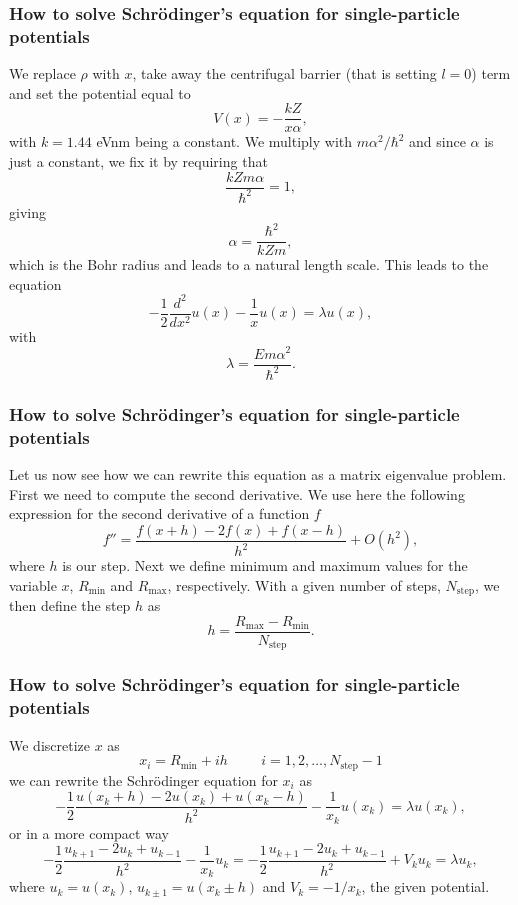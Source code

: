 \documentclass[compress]{beamer}
\begin{document}
\frame
{
  \frametitle{How to solve Schr\"odinger's equation for single-particle potentials}
\begin{small}
{\scriptsize
%
We replace $\rho$ with $x$, take away the 
centrifugal barrier (that is setting $l=0$) term and set the potential equal to
\[
   V(x)=-\frac{kZ}{x\alpha},
\]
with  $k=1.44$ eVnm being a constant. We multiply with $m \alpha^2/\hbar^2$ and since $\alpha$ is just a constant, we fix it by requiring that
\[
\frac{kZm \alpha}{\hbar^2}=1,
\]
giving 
\[
\alpha = \frac{\hbar^2}{kZm},
\]
which is the Bohr radius and leads to a natural length scale.
This leads to the equation
\[
  -\frac{1}{2} \frac{d^2}{dx^2} u(x) -\frac{1}{x}u(x)  = \lambda u(x),
\]
with 
\[
\lambda = \frac{E m \alpha^2}{\hbar^2}. 
\]
}
\end{small}
}


%



\frame
{
  \frametitle{How to solve Schr\"odinger's equation for single-particle potentials}
\begin{small}
{\scriptsize
Let us now see how we can rewrite this equation as a matrix eigenvalue problem.
First we need to compute  the second derivative. We use here the
following expression for the second derivative of a function $f$
\[
    f''=\frac{f(x+h) -2f(x) +f(x-h)}{h^2} +O(h^2),
\]
where $h$ is our step.
Next we define minimum and maximum values for the variable $x$,
$R_{\mathrm{min}}$  and $R_{\mathrm{max}}$, respectively.
With a given number of steps, $N_{\mathrm{step}}$, we then 
define the step $h$ as
\[
  h=\frac{R_{\mathrm{max}}-R_{\mathrm{min}} }{N_{\mathrm{step}}}.
\]

}
\end{small}
}


\frame
{
  \frametitle{How to solve Schr\"odinger's equation for single-particle potentials}
\begin{small}
{\scriptsize
We discretize  $x$ as 
\[
    x_i= R_{\mathrm{min}} + ih \hspace{1cm} i=1,2,\dots , N_{\mathrm{step}}-1
\]
we can rewrite the Schr\"odinger equation for $x_i$ as
\[
-\frac{1}{2}\frac{u(x_k+h) -2u(x_k) +u(x_k-h)}{h^2}-\frac{1}{x_k}u(x_k)  = \lambda u(x_k),
\]
or in  a more compact way
\[
-\frac{1}{2}\frac{u_{k+1} -2u_k +u_{k-1}}{h^2}-\frac{1}{x_k}u_k=-\frac{1}{2}\frac{u_{k+1} -2u_k +u_{k-1} }{h^2}+V_ku_k  = \lambda u_k,
\]
where $u_k=u(x_k)$, $u_{k\pm 1}=u(x_k\pm h)$ and $V_k=-1/x_k$, the given potential.
}
\end{small}
}
\end{document}
